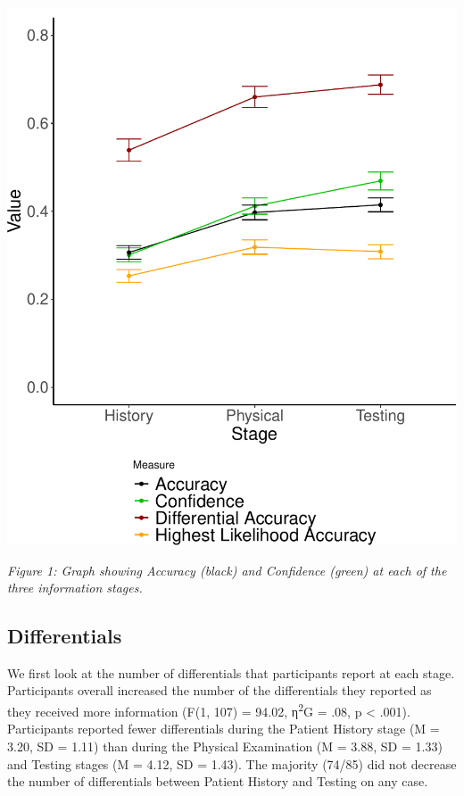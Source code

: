 \documentclass[a4paper, nobind]{templates/ociamthesis}
\begin{document}
\includegraphics{_main_files/figure-latex/meyerGraph-1.pdf}

\emph{Figure 1: Graph showing Accuracy (black) and Confidence (green) at each of the three information stages.}

\hypertarget{differentials}{%
\subsection{Differentials}\label{differentials}}

We first look at the number of differentials that participants report at each stage. Participants overall increased the number of the differentials they reported as they received more information (F(1, 107) = 94.02, η\textsuperscript{2}G = .08, p \textless{} .001). Participants reported fewer differentials during the Patient History stage (M = 3.20, SD = 1.11) than during the Physical Examination (M = 3.88, SD = 1.33) and Testing stages (M = 4.12, SD = 1.43). The majority (74/85) did not decrease the number of differentials between Patient History and Testing on any case.
\end{document}
